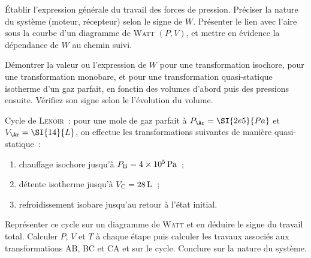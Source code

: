 \documentclass[a4paper, 11pt, final, garamond]{book}
\begin{document}
\begin{enumerate}[label=\sqenumi]
	\litem{23pt}{\strr}%
	Établir l'expression générale du travail des forces de pression.
	Préciser la nature du système (moteur, récepteur) selon le signe de $W$.
	Présenter le lien avec l'aire sous la courbe d'un diagramme de
	\textsc{Watt} $(P,V)$, et mettre en évidence la dépendance de $W$ au
	chemin suivi.

	\litem{23pt}{\strr}%
	Démontrer la valeur ou l'expression de $W$ pour une
	transformation isochore, pour une transformation monobare, et pour une
	transformation quasi-statique isotherme d'un gaz parfait, en fonctin des
	volumes d'abord puis des pressions ensuite. Vérifiez son signe selon le
	l'évolution du volume.

	\litem{23pt}{\strr}%
	Cycle de \textsc{Lenoir}~: pour une mole de gaz parfait à $P_\Ar =
		\SI{2e5}{Pa}$ et $V_\Ar = \SI{14}{L}$, on effectue les transformations
	suivantes de manière quasi-statique~:
	\begin{enumerate}[label=\alph*)]
		\item chauffage isochore jusqu'à $P_{\rm B} = \SI{4e5}{Pa}$~;
		\item détente isotherme jusqu'à $V_{\rm C} = \SI{28}{L}$~;
		\item refroidissement isobare jusqu'au retour à l'état initial.
	\end{enumerate}
	Représenter ce cycle sur un diagramme de \textsc{Watt} et en déduire le
	signe du travail total. Calculer $P$, $V$ et $T$ à chaque étape puis
	calculer les travaux associés aux transformations AB, BC et CA et sur le
	cycle. Conclure sur la nature du système.
\end{enumerate}
\end{document}
